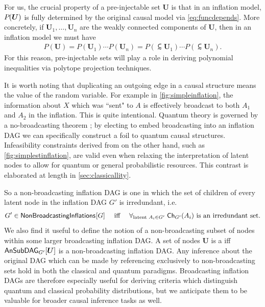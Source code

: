 For us, the crucial property of a pre-injectable set $\bm{U}$ is that in an inflation model, $\pdf{\bm{U}}$ is fully determined by the original causal model via \cref{eq:funcdepends}. More concretely, if $\bm{U}_1,\ldots,\bm{U}_n$ are the weakly connected components of $\bm{U}$, then in an inflation model we must have
\begin{align}\label{eq:preinjfactor}
	P(\bm{U}) = P(\bm{U}_1) \cdots P(\bm{U}_n) = P(\subsim{\bm{U}}_1) \cdots P(\subsim{\bm{U}}_n).
\end{align}
For this reason, pre-injectable sets will play a role in deriving polynomial inequalities via polytope projection techniques.

It is worth noting that duplicating an outgoing edge in a causal structure means  the value of the random variable. For example in \cref{fig:simpleinflation}, the information about $X$ which was ``sent" to $A$ is effectively broadcast to both $A_1$ and $A_2$ in the inflation. This is quite intentional. Quantum theory is governed by a no-broadcasting theorem \cite{NoCloningQuantum1996,NoCloningGeneral2006}; by electing to embed broadcasting into an inflation DAG we can specifically construct a foil to quantum causal structures. Infeasibility constraints derived from  on the other hand, such as \cref{fig:simplestinflation}, are valid even when relaxing the interpretation of latent nodes to allow for quantum or general probabilistic resources. This contrast is elaborated at length in \cref{sec:classicallity}.  

So a non-broadcasting inflation DAG is one in which the set of children of every latent node in the inflation DAG $G'$ is irredundant, i.e.  
\begin{align}\label{eq:nonbroadcastinginflationDAG}
G'\in\SmallNamedFunction{NonBroadcastingInflations}{G} \quad\text{ iff }\quad \forall_{\text{latent }A_i\in G'}\; \Ch[G']{A_i} \text{ is an irredundant set.}
\end{align}
We also find it useful to define the notion of a non-broadcasting subset of nodes within some larger broadcasting inflation DAG. A set of nodes $\bm{U}$ is a  iff $\ansubgraph[G']{\bm{U}}$ is a non-broadcasting inflation DAG. Any inference about the original DAG which can be made by referencing exclusively to non-broadcasting sets hold in both the classical and quantum paradigms. Broadcasting inflation DAGs are therefore especially useful for deriving criteria which distinguish quantum and classical probability distributions, but we anticipate them to be valuable for broader causal inference tasks as well.


